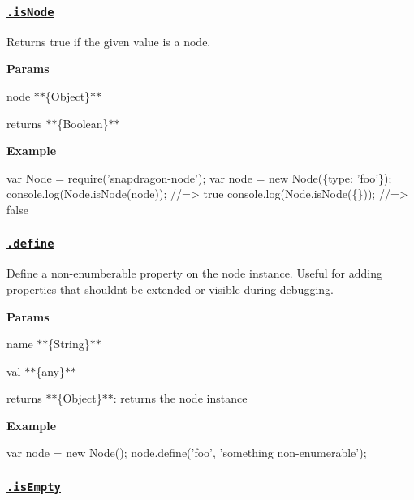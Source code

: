 \subsubsection*{\href{index.js#L61}{\tt .is\+Node}}

Returns true if the given value is a node.

{\bfseries Params}


\begin{DoxyItemize}
\item {\ttfamily node} $\ast$$\ast$\{Object\}$\ast$$\ast$
\item {\ttfamily returns} $\ast$$\ast$\{Boolean\}$\ast$$\ast$
\end{DoxyItemize}

{\bfseries Example}


\begin{DoxyCode}
var Node = require('snapdragon-node');
var node = new Node(\{type: 'foo'\});
console.log(Node.isNode(node)); //=> true
console.log(Node.isNode(\{\})); //=> false
\end{DoxyCode}


\subsubsection*{\href{index.js#L80}{\tt .define}}

Define a non-\/enumberable property on the node instance. Useful for adding properties that shouldn\textquotesingle{}t be extended or visible during debugging.

{\bfseries Params}


\begin{DoxyItemize}
\item {\ttfamily name} $\ast$$\ast$\{String\}$\ast$$\ast$
\item {\ttfamily val} $\ast$$\ast$\{any\}$\ast$$\ast$
\item {\ttfamily returns} $\ast$$\ast$\{Object\}$\ast$$\ast$\+: returns the node instance
\end{DoxyItemize}

{\bfseries Example}


\begin{DoxyCode}
var node = new Node();
node.define('foo', 'something non-enumerable');
\end{DoxyCode}


\subsubsection*{\href{index.js#L100}{\tt .is\+Empty}}

